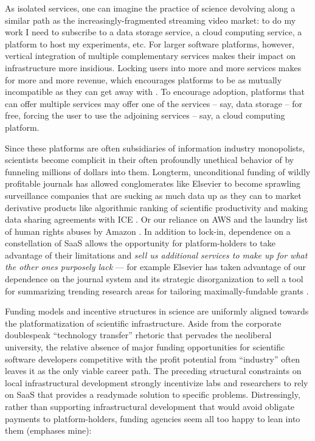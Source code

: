 As isolated services, one can imagine the practice of science devolving
along a similar path as the increasingly-fragmented streaming video
market: to do my work I need to subscribe to a data storage service, a
cloud computing service, a platform to host my experiments, etc. For
larger software platforms, however, vertical integration of multiple
complementary services makes their impact on infrastructure more
insidious. Locking users into more and more services makes for more and
more revenue, which encourages platforms to be as mutually incompatible
as they can get away with \citep{macinnesCompatibilityStandardsMonopoly2005} . To encourage adoption,
platforms that can offer multiple services may offer one of the services
-- say, data storage -- for free, forcing the user to use the adjoining
services -- say, a cloud computing platform.

Since these platforms are often subsidiaries of information industry
monopolists, scientists become complicit in their often profoundly
unethical behavior of by funneling millions of dollars into them.
Longterm, unconditional funding of wildly profitable journals has
allowed conglomerates like Elsevier to become sprawling surveillance
companies \citep{RELXAnnualReport2020, pooleySurveillancePublishing2021}  that are sucking as much data up
as they can to market derivative products like algorithmic ranking of
scientific productivity \citep{brembsAlgorithmicEmploymentDecisions2021}  and making data sharing
agreements with ICE \citep{biddleLexisNexisProvideGiant2021} . Or
our reliance on AWS and the laundry list of human rights abuses by
Amazon \citep{CriticismAmazon2021} . In addition to lock-in,
dependence on a constellation of SaaS allows the opportunity for
platform-holders to take advantage of their limitations and \emph{sell
us additional services to make up for what the other ones purposely
lack} --- for example Elsevier has taken advantage of our dependence on
the journal system and its strategic disorganization to sell a tool for
summarizing trending research areas for tailoring maximally-fundable
grants \citep{elsevierTopicProminenceSciencea} .

Funding models and incentive structures in science are uniformly aligned
towards the platformatization of scientific infrastructure. Aside from
the corporate doublespeak ``technology transfer'' rhetoric that pervades
the neoliberal university, the relative absence of major funding
opportunities for scientific software developers competitive with the
profit potential from ``industry'' often leaves it as the only viable
career path. The preceding structural constraints on local
infrastructural development strongly incentivize labs and researchers to
rely on SaaS that provides a readymade solution to specific problems.
Distressingly, rather than supporting infrastructural development that
would avoid obligate payments to platform-holders, funding agencies seem
all too happy to lean into them (emphases mine):

